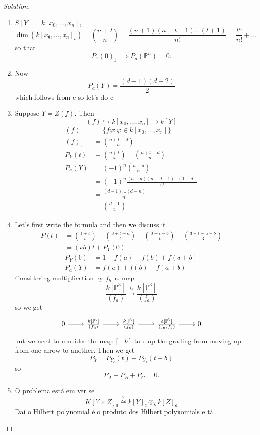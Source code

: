 \begin{proof}[Solution]\leavevmode
	\begin{enumerate}[label=\alph*.]
		\item $S[Y]=k[x_0,\ldots,x_n]$, 
		\[\dim (k[x_0,\ldots,x_n]_t)=\binom{n+t}{n}=\frac{(n+1)(n+t-1)\ldots(t+1)}{n!}=\frac{t^n}{n!}+\ldots\]
			so that
			\[P_Y(0)_1\implies P_a(\mathbb{P}^n)=0.\]
	
			\item Now
				\[P_a(Y)=\frac{(d-1)(d-2)}{2}\]
				which follows from c so let's do c.

			\item Suppose $Y=Z(f)$. Then
			\[(f)\hookrightarrow k[x_0,\ldots,x_n]\to k[Y]\]
			\begin{align*}
				(f)& =\{f\varphi:\varphi\in k[x_0,\ldots,x_n]\} \\
				(f)_t&=\binom{n+t-d}{n}\\
			P_Y(t)&=\binom{n+t}{n}-\binom{n+t-d}{n}\\
			P_a(Y)&=(-1)^n\binom{n-d}{n}\\
			&=(-1)^n\frac{(n-d)(n-d-1)\ldots(1-d)}{n!}\\
			&=\frac{(d-1)\ldots(d-n)}{n!}\\
			& =\binom{d-1}{n}
			\end{align*}

			\item Let's first write the formula and then we discuss it
				\begin{align*}P(t)&=\binom{3+t}{t}-\binom{3+t-a}{t}-\binom{3+t-b}{t}+\binom{3+t-a-b}{3}\\
					&=(ab)t+P_Y(0)
					\end{align*}
					\begin{align*}
						P_Y(0)&=1-f(a)-f(b)+f(a+b)\\
						P_a(Y)&=f(a)+f(b)-f(a+b)
					\end{align*}
					Considering multiplication by $f_b$ as map
					\[\frac{k[\mathbb{P}^3]}{(f_a)}\overset{f_b}{\longrightarrow}\frac{k[\mathbb{P}^3]}{(f_a)}\]
					so we get
					\[\begin{tikzcd}
						0\arrow[r]&\frac{k[\mathbb{P}^3]}{(f_a)}\arrow[r]&\frac{k[\mathbb{P}^3]}{(f_a)}\arrow[r]&\frac{k[\mathbb{P}^3]}{(f_a,f_b)}\arrow[r]&0
					\end{tikzcd}\]
					but we need to consider the map $[-b]$ to stop the grading from moving up from one arrow to another. Then we get
					\[P_Y=P_{Y_a}(t)-P_{Y_a}(t-b)\]
					so
					\[P_A-P_B+P_C=0.\]

	\item O problema est\'a em ver se
		\[K[Y\times Z]_d\overset{?}{\cong}k[Y]_d \otimes_k k[Z]_d\]
	Da\'i o Hilbert polynomial \'e o produto dos Hilbert polynomials e t\'a.
	\end{enumerate}
\end{proof}

